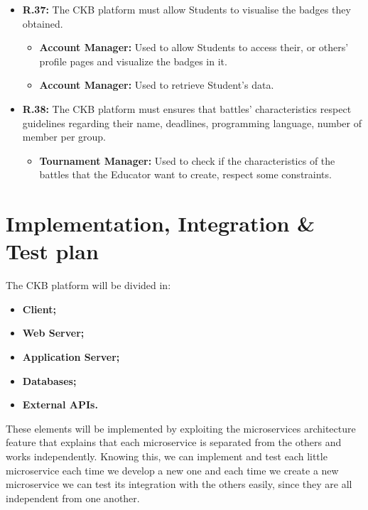 \documentclass{article}
\begin{document}
{\begin{itemize}
\begin{itemize}
          \end{itemize}
    \item \textbf{R.37:} The CKB platform must allow Students to visualise the badges they obtained.
          \begin{itemize}
              \item \textbf{Account Manager:} Used to allow Students to access their, or others'
              profile pages and visualize the badges in it.
              \item \textbf{Account Manager:} Used to retrieve Student's data.
          \end{itemize}
    \item \textbf{R.38:} The CKB platform must ensures that battles' characteristics respect guidelines
          regarding their name, deadlines, programming language, number of member per group.
          \begin{itemize}
            \item \textbf{Tournament Manager:} Used to check if the characteristics of the battles
              that the Educator want to create, respect some constraints.
          \end{itemize}
\end{itemize}
\section{Implementation, Integration \& Test plan}
The CKB platform will be divided in:
\begin{itemize}
    \item \textbf{Client;}
    \item \textbf{Web Server;}
    \item \textbf{Application Server;}
    \item \textbf{Databases;}
    \item \textbf{External APIs.}
\end{itemize}
These elements will be implemented by exploiting the microservices architecture feature that explains that each microservice is separated from the others 
and works independently.
Knowing this, we can implement and test each little microservice each time we develop a new one and each time we create a new microservice we
can test its integration with the others easily, since they are all independent from one another.

\newpage
}
\end{document}
